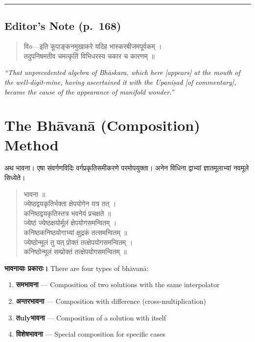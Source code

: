 \documentclass[11pt,a4paper]{article}
\newcommand{\longline}{\noindent\rule{\textwidth}{0.4pt}}
\newcommand{\cnote}[1]{\textcolor{notecolor}{\textit{#1}}}
\newcommand{\dev}[1]{{\devanagarifont #1}}
\newenvironment{sanskritverse}{%
  \begin{verse}
}{%
  \end{verse}
}
\begin{document}
\longline

\subsection*{Editor's Note (p.\ 168)}

\begin{sanskritverse}
\dev{%
वि०—इति कूपाङ्कनमुखाकरे यदिह भास्करबीजमपूर्वकम् ।\\
तदुपनिषमतीव चमत्कृतिं विभिधरस्य चकार च कारणम् ॥}
\end{sanskritverse}

\cnote{``That unprecedented algebra of Bhāskara, which here [appears] at the mouth of the well-digit-mine, having ascertained it with the Upaniṣad [of commentary], became the cause of the appearance of manifold wonder.''}

\section*{The Bhāvanā (Composition) Method}

\lettrine[lines=3, lraise=0.1, nindent=0em, slope=-.5em]{\dev{अ}}{}थ भावना। एषा संवर्गणविदिः वर्गप्रकृतिसमीकरणे परमोपयुक्ता। अनेन विधिना द्वाभ्यां ज्ञातमूलाभ्यां नवमूले सिध्येते।

\vs

\begin{sanskritverse}
\dev{%
भावना ॥\\[0.5em]
ज्येष्ठद्वयकृतिर्भक्ता क्षेपयोगेन यत्र तत् ।\\
कनिष्ठद्वयकृतिस्तत्र भवनेयं प्रचक्षते ॥}\\[0.5em]
\dev{%
ज्येष्ठं ज्येष्ठक्षयोर्मूलं क्षेपयोगसमन्वितम् ।\\
कनिष्ठकनिष्ठयोगाभ्यां क्षुद्रकं तत्समन्वितम् ॥}\\[0.5em]
\dev{%
ज्येष्ठोन्मूलं तु यत् प्रोक्तं तत्क्षेपयोगसमन्वितम् ।\\
कनिष्ठोन्मूलं सम्प्रोक्तं तत्क्षेपयोगसमन्वितम् ॥}
\end{sanskritverse}

\vs

\noindent\textbf{\dev{भावनायाः प्रकाराः।}} There are four types of bh\={a}van\={a}:

\begin{enumerate}[label=\textbf{\dev{(\roman*)}}]
  \item \textbf{\dev{समभावना}} --- Composition of two solutions with the same interpolator
  \item \textbf{\dev{अन्तरभावना}} --- Composition with difference (cross-multiplication)
  \item \textbf{\dev{तulyभावना}} --- Composition of a solution with itself
  \item \textbf{\dev{विशेषभावना}} --- Special composition for specific cases
\end{enumerate}
\end{document}
